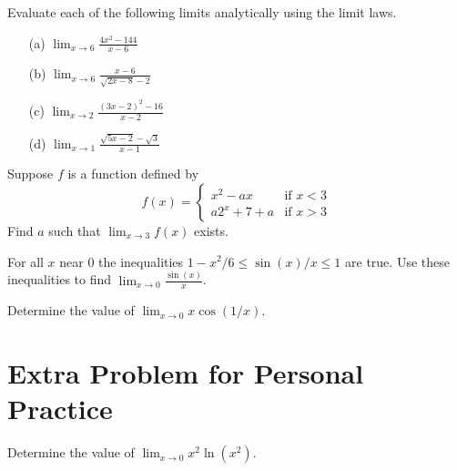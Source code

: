 \documentclass[handout,nooutcomes]{ximera}
\begin{document}
\begin{problem}
  \label{problem:evaluating-limits}
  Evaluate each of the following limits analytically using the limit laws.
  \begin{itemize}
    \item[(a)]
      $\displaystyle
        \lim_{x \to 6} \frac{4x^2 - 144}{x-6}
      $
    \item[(b)]
      $\displaystyle
        \lim_{x \to 6} \frac{x-6}{\sqrt{2x-8} - 2}
      $
    \item[(c)]
      $\displaystyle
        \lim_{x \to 2} \frac{(3x-2)^2 - 16}{x-2}
      $
    \item[(d)]
      $\displaystyle
        \lim_{x \to 1} \frac{\sqrt{5x-2} - \sqrt{3}}{x-1}
      $
  \end{itemize}
\end{problem}

\begin{problem}
  \label{problem:evaluating-limit-of-piecewise-function}
  Suppose $f$ is a function defined by
  \[
    f(x) =
    \begin{cases}
      x^2 - ax & \mbox{if $x < 3$}\\
      a2^x + 7 + a & \mbox{if $x > 3$}
    \end{cases}
  \]
  Find $a$ such that $\lim_{x \to 3} f(x)$ exists.
\end{problem}

\begin{problem}
  \label{problem:squeeze-theorem-application}
  For all $x$ near 0 the inequalities $1 - x^2/6 \le \sin(x)/x \le 1$ are true.
  Use these inequalities to find $\displaystyle\lim_{x \to 0} \frac{\sin(x)}{x}$.  
\end{problem}

\begin{problem}
  \label{problem:squeeze-theorem-again}
  Determine the value of $\displaystyle\lim_{x \to 0} x \cos(1/x)$.
\end{problem}

\section{Extra Problem for Personal Practice}
\label{section:extra-problems}
\begin{problem}
  \label{problem:squeeze-theorem-not-trig}
  Determine the value of $\displaystyle\lim_{x \to 0} x^2 \ln(x^2)$.
\end{problem}
\end{document}
